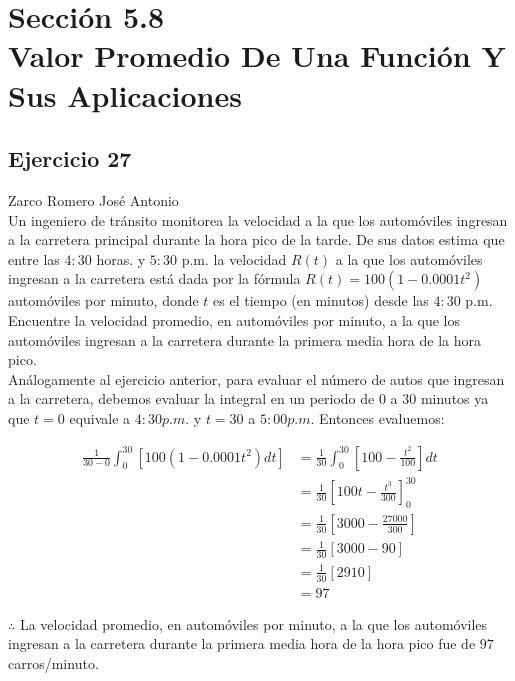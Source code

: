\documentclass[12pt]{article}
\begin{document}
\section{Sección 5.8 \\ Valor Promedio De Una Función Y Sus Aplicaciones}
\subsection{Ejercicio 27} Zarco Romero José Antonio \\

Un ingeniero de tránsito monitorea la velocidad a la que los automóviles ingresan a la carretera principal durante la hora pico de la tarde. De sus datos estima que entre las $4:30$ horas. y $5:30$ p.m. la velocidad $R(t)$ a la que los automóviles ingresan a la carretera está dada por la fórmula $R(t) = 100(1-0.0001t^2)$ automóviles por minuto, donde $t$ es el tiempo (en minutos) desde las $4:30$ p.m. Encuentre la velocidad promedio, en automóviles por minuto, a la que los automóviles ingresan a la carretera durante la primera media hora de la hora pico. \\

Análogamente al ejercicio anterior, para evaluar el número de autos que ingresan a la carretera, debemos evaluar la integral en un periodo de 0 a 30 minutos ya que $t=0$ equivale a $4:30 p.m.$ y $t=30$ a $5:00 p.m.$ Entonces evaluemos:

\begin{align*}
  \frac{1}{30-0} \int_0^{30} \left[ 100 (1- 0.0001t^2) dt \right]
  & = \frac{1}{30} \int_0^{30} \left[ 100-\frac{t^2}{100} \right] dt \\
  & =  \frac{1}{30} \left[ 100t-\frac{t^3}{300} \right]_{0}^{30} \\
  & =  \frac{1}{30} \left[ 3000-\frac{27000}{300} \right] \\
  & =  \frac{1}{30} \left[ 3000-90 \right] \\
  & =  \frac{1}{30} \left[ 2910 \right] \\
  &= 97
\end{align*}

$\therefore $ La velocidad promedio, en automóviles por minuto, a la que los automóviles ingresan a la carretera durante la primera media hora de la hora pico fue de $97 $ carros/minuto.


\end{document}
